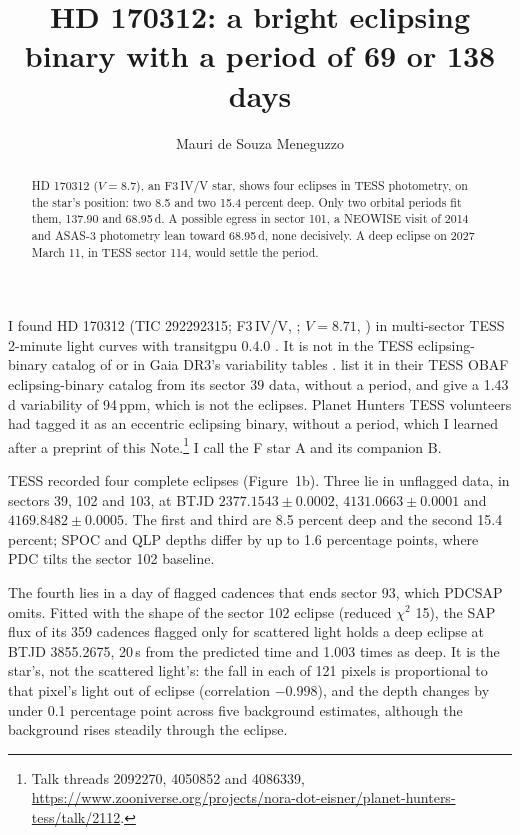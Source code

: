 \documentclass[RNAAS]{aastex631}
\begin{document}
\title{HD 170312: a bright eclipsing binary with a period of 69 or 138 days}

\author[0009-0000-0032-3262]{Mauri de Souza Meneguzzo}

\begin{abstract}
HD 170312 ($V=8.7$), an F3\,IV/V star, shows four eclipses in TESS photometry, on the star's position: two 8.5 and two 15.4 percent deep. Only two orbital periods fit them, 137.90 and 68.95\,d. A possible egress in sector 101, a NEOWISE visit of 2014 and ASAS-3 photometry lean toward 68.95\,d, none decisively. A deep eclipse on 2027 March 11, in TESS sector 114, would settle the period.
\end{abstract}


\section*{}

I found HD 170312 (TIC 292292315; F3\,IV/V, \citealt{Houk1975}; $V=8.71$, \citealt{Stassun2019}) in multi-sector TESS 2-minute light curves \citep{Ricker2015,Jenkins2016} with transitgpu 0.4.0 \citep{Meneguzzo2026}. It is not in the TESS eclipsing-binary catalog of \citet{Prsa2022} or in Gaia DR3's variability tables \citep{GaiaMission,GaiaDR3}. \citet{IJspeert2024} list it in their TESS OBAF eclipsing-binary catalog from its sector 39 data, without a period, and \citet{Fetherolf2023} give a 1.43\,d variability of 94\,ppm, which is not the eclipses. Planet Hunters TESS volunteers \citep{Eisner2021} had tagged it as an eccentric eclipsing binary, without a period, which I learned after a preprint of this Note.\footnote{Talk threads 2092270, 4050852 and 4086339, \url{https://www.zooniverse.org/projects/nora-dot-eisner/planet-hunters-tess/talk/2112}.} I call the F star A and its companion B.

TESS recorded four complete eclipses (Figure~1b). Three lie in unflagged data, in sectors 39, 102 and 103, at BTJD $2377.1543\pm0.0002$, $4131.0663\pm0.0001$ and $4169.8482\pm0.0005$. The first and third are 8.5 percent deep and the second 15.4 percent; SPOC and QLP depths differ by up to 1.6 percentage points, where PDC tilts the sector 102 baseline.

The fourth lies in a day of flagged cadences that ends sector 93, which PDCSAP omits. Fitted with the shape of the sector 102 eclipse (reduced $\chi^2$ 15), the SAP flux of its 359 cadences flagged only for scattered light holds a deep eclipse at BTJD 3855.2675, 20\,s from the predicted time and 1.003 times as deep. It is the star's, not the scattered light's: the fall in each of 121 pixels is proportional to that pixel's light out of eclipse (correlation $-0.998$), and the depth changes by under 0.1 percentage point across five background estimates, although the background rises steadily through the eclipse.
\end{document}
